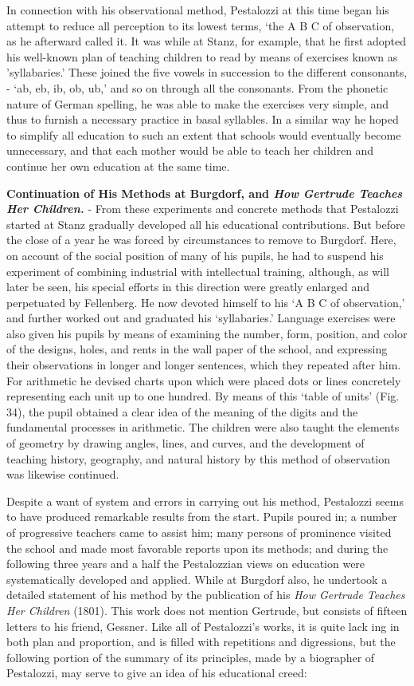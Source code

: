 \documentclass[
]{book}
\begin{document}
In connection with his observational method, Pestalozzi at this time began his attempt to reduce all perception to its lowest terms, `the A B C of observation, as he afterward called it. It was while at Stanz, for example, that he first adopted his well-known plan of teaching children to read by means of exercises known as 'syllabaries.' These joined the five vowels in succession to the different consonants, - `ab, eb, ib, ob, ub,' and so on through all the consonants. From the phonetic nature of German spelling, he was able to make the exercises very simple, and thus to furnish a necessary practice in basal syllables. In a similar way he hoped to simplify all education to such an extent that schools would eventually become unnecessary, and that each mother would be able to teach her children and continue her own education at the same time.

\textbf{Continuation of His Methods at Burgdorf, and \emph{How Gertrude Teaches Her Children.}} - From these experiments and concrete methods that Pestalozzi started at Stanz gradually developed all his educational contributions. But before the close of a year he was forced by circumstances to remove to Burgdorf. Here, on account of the social position of many of his pupils, he had to suspend his experiment of combining industrial with intellectual training, although, as will later be seen, his special efforts in this direction were greatly enlarged and perpetuated by Fellenberg. He now devoted himself to his `A B C of observation,' and further worked out and graduated his `syllabaries.' Language exercises were also given his pupils by means of examining the number, form, position, and color of the designs, holes, and rents in the wall paper of the school, and expressing their observations in longer and longer sentences, which they repeated after him. For arithmetic he devised charts upon which were placed dots or lines concretely representing each unit up to one hundred. By means of this `table of units' (Fig. 34), the pupil obtained a clear idea of the meaning of the digits and the fundamental processes in arithmetic. The children were also taught the elements of geometry by drawing angles, lines, and curves, and the development of teaching history, geography, and natural history by this method of observation was likewise continued.

Despite a want of system and errors in carrying out his method, Pestalozzi seems to have produced remarkable results from the start. Pupils poured in; a number of progressive teachers came to assist him; many persons of prominence visited the school and made most favorable reports upon its methods; and during the following three years and a half the Pestalozzian views on education were systematically developed and applied. While at Burgdorf also, he undertook a detailed statement of his method by the publication of his \emph{How Gertrude Teaches Her Children} (1801). This work does not mention Gertrude, but consists of fifteen letters to his friend, Gessner. Like all of Pestalozzi's works, it is quite lack ing in both plan and proportion, and is filled with repetitions and digressions, but the following portion of the summary of its principles, made by a biographer of Pestalozzi, may serve to give an idea of his educational creed:
\end{document}

